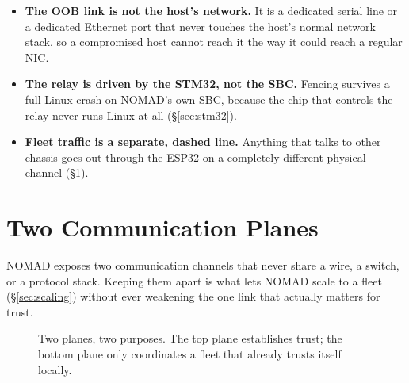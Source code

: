 \documentclass[11pt,a4paper]{article}
\newcommand{\figcap}[1]{\caption{#1}}
\begin{document}
\begin{itemize}
  \item \textbf{The OOB link is not the host's network.} It is a
    dedicated serial line or a dedicated Ethernet port that never
    touches the host's normal network stack, so a compromised host
    cannot reach it the way it could reach a regular NIC.
  \item \textbf{The relay is driven by the STM32, not the SBC.} Fencing
    survives a full Linux crash on NOMAD's own SBC, because the chip that
    controls the relay never runs Linux at all (\S\ref{sec:stm32}).
  \item \textbf{Fleet traffic is a separate, dashed line.} Anything
    that talks to other chassis goes out through the ESP32 on a
    completely different physical channel (\S\ref{sec:planes}).
\end{itemize}

\section{Two Communication Planes}
\label{sec:planes}

NOMAD exposes two communication channels that never share a wire, a
switch, or a protocol stack. Keeping them apart is what lets NOMAD scale
to a fleet (\S\ref{sec:scaling}) without ever weakening the one link
that actually matters for trust.

\begin{figure}[h!]
\centering
{}
\figcap{Two planes, two purposes. The top plane establishes trust; the bottom plane only coordinates a fleet that already trusts itself locally.}
\label{fig:planes}
\end{figure}
\end{document}
